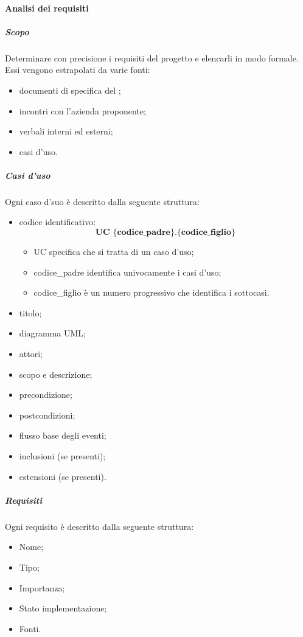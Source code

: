 \paragraph{Analisi dei requisiti}
\subparagraph{Scopo}\Spazio
Determinare con precisione i requisiti del progetto e elencarli in modo formale. Essi vengono estrapolati da varie fonti:
\begin{itemize}
	\item documenti di specifica del ;
	\item incontri con l'azienda proponente;
	\item verbali interni ed esterni;
	\item casi d'uso.
\end{itemize}
\subparagraph{Casi d'uso}\Spazio
Ogni caso d'suo è descritto dalla seguente struttura:
\begin{itemize}
	\item codice identificativo: $$ \textbf{UC \{codice\_padre\}.\{codice\_figlio\}  } $$
		\begin{itemize}
				\item UC specifica che si tratta di un caso d'uso;
				\item codice\_padre identifica univocamente i casi d'uso;
				\item codice\_figlio è un numero progressivo che identifica i sottocasi.
		\end{itemize}
	\item titolo;
	\item diagramma UML;
	\item attori;
	\item scopo e descrizione;
	\item precondizione;
	\item postcondizioni;
	\item flusso base degli eventi;
	\item inclusioni (se presenti);
	\item estensioni (se presenti).
\end{itemize}
\subparagraph{Requisiti}\Spazio
Ogni requisito è descritto dalla seguente struttura:
\begin{itemize}
	\item Nome;
	\item Tipo;
	\item Importanza;
	\item Stato implementazione;
	\item Fonti.
\end{itemize}

